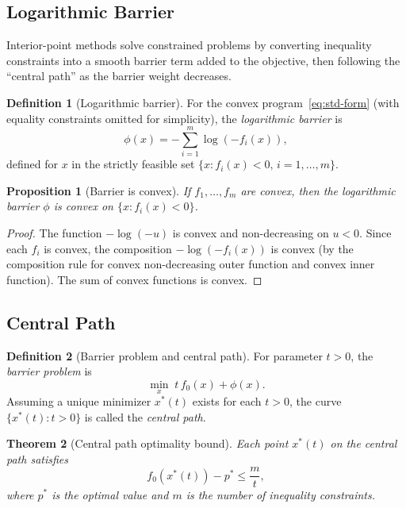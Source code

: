 \documentclass[11pt,a4paper]{article}
\theoremstyle{definition}
\newtheorem{definition}{Definition}[section]
\theoremstyle{plain}
\newtheorem{theorem}{Theorem}[section]
\newtheorem{proposition}[theorem]{Proposition}
\theoremstyle{remark}
\begin{document}
\subsection{Logarithmic Barrier}

Interior-point methods solve constrained problems by converting inequality
constraints into a smooth barrier term added to the objective, then following
the ``central path'' as the barrier weight decreases.

\begin{definition}[Logarithmic barrier]\label{def:barrier}
For the convex program~\eqref{eq:std-form} (with equality constraints omitted
for simplicity), the \emph{logarithmic barrier} is
\begin{equation}\label{eq:barrier}
  \phi(x) = -\sum_{i=1}^m \log(-f_i(x)),
\end{equation}
defined for $x$ in the strictly feasible set $\{x : f_i(x) < 0, \, i = 1,\dots,m\}$.
\end{definition}

\begin{proposition}[Barrier is convex]\label{prop:barrier-convex}
If $f_1, \dots, f_m$ are convex, then the logarithmic barrier $\phi$ is convex
on $\{x : f_i(x) < 0\}$.
\end{proposition}

\begin{proof}
The function $-\log(-u)$ is convex and non-decreasing on $u < 0$. Since each
$f_i$ is convex, the composition $-\log(-f_i(x))$ is convex (by the
composition rule for convex non-decreasing outer function and convex inner
function). The sum of convex functions is convex.
\end{proof}

\subsection{Central Path}

\begin{definition}[Barrier problem and central path]\label{def:central-path}
For parameter $t > 0$, the \emph{barrier problem} is
\begin{equation}\label{eq:barrier-prob}
  \min_x \; t\, f_0(x) + \phi(x).
\end{equation}
Assuming a unique minimizer $x^*(t)$ exists for each $t > 0$, the curve
$\{x^*(t) : t > 0\}$ is called the \emph{central path}.
\end{definition}

\begin{theorem}[Central path optimality bound]\label{thm:central-path}
Each point $x^*(t)$ on the central path satisfies
\begin{equation}\label{eq:central-bound}
  f_0(x^*(t)) - p^* \le \frac{m}{t},
\end{equation}
where $p^*$ is the optimal value and $m$ is the number of inequality
constraints.
\end{theorem}
\end{document}

